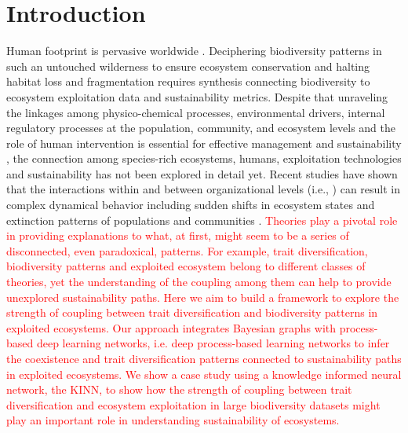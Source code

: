 \documentclass[12pt,a4paper]{article}
\begin{document}
\newpage

\section{Introduction}
Human footprint is pervasive worldwide \citep{marconcini2020outlining, mcdowell2020pervasive}. Deciphering biodiversity patterns in such an untouched wilderness to ensure ecosystem conservation and halting habitat loss and fragmentation \citep{brum2017global} requires synthesis connecting biodiversity to ecosystem exploitation data and sustainability metrics. Despite that unraveling the linkages among physico-chemical processes, environmental drivers, internal regulatory processes at the population, community, and ecosystem levels and the role of human intervention is essential for effective management and sustainability \citep{hobbs2011intervention}, the connection among species-rich ecosystems, humans, exploitation technologies and sustainability has not been explored in detail yet. Recent studies have shown that the interactions within and between organizational levels (i.e., ) can result in complex dynamical behavior including sudden shifts in ecosystem states and extinction patterns of populations and communities \citep{newman2019scaling}. \textcolor{red}{Theories play a pivotal role in providing explanations to what, at first, might seem to be a series of disconnected, even paradoxical, patterns. For example, trait diversification, biodiversity patterns and exploited ecosystem belong to different classes of theories, yet the understanding of the coupling among them can help to provide unexplored sustainability paths. Here we aim to build a framework to explore the strength of coupling between trait diversification and biodiversity patterns in exploited ecosystems. Our approach integrates Bayesian graphs with process-based deep learning networks, i.e. deep process-based learning networks to infer the coexistence and trait diversification patterns connected to sustainability paths in exploited ecosystems. We show a case study using a knowledge informed neural network, the KINN, to show how the strength of coupling between trait diversification and ecosystem exploitation in large biodiversity datasets might play an important role in understanding sustainability of ecosystems.}
\end{document}
